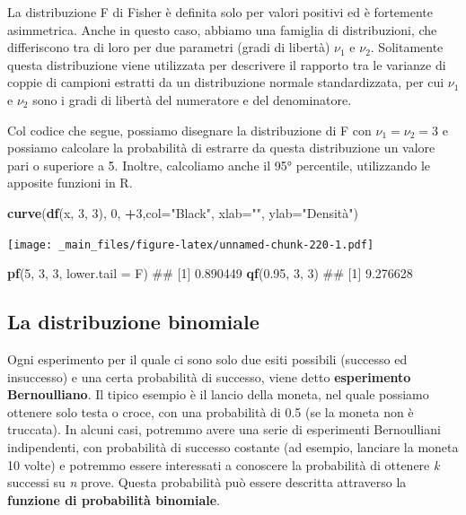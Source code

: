 \documentclass[a4paper,12pt,oneside]{book}
\newenvironment{Shaded}{\begin{snugshade}}{\end{snugshade}}
\newcommand{\KeywordTok}[1]{\textcolor[rgb]{0.13,0.29,0.53}{\textbf{#1}}}
\newcommand{\DataTypeTok}[1]{\textcolor[rgb]{0.13,0.29,0.53}{#1}}
\newcommand{\DecValTok}[1]{\textcolor[rgb]{0.00,0.00,0.81}{#1}}
\newcommand{\FloatTok}[1]{\textcolor[rgb]{0.00,0.00,0.81}{#1}}
\newcommand{\StringTok}[1]{\textcolor[rgb]{0.31,0.60,0.02}{#1}}
\newcommand{\OperatorTok}[1]{\textcolor[rgb]{0.81,0.36,0.00}{\textbf{#1}}}
\newcommand{\NormalTok}[1]{#1}
\theoremstyle{definition}
\theoremstyle{definition}
\theoremstyle{definition}
\theoremstyle{remark}
\begin{document}
La distribuzione F di Fisher è definita solo per valori positivi ed è
fortemente asimmetrica. Anche in questo caso, abbiamo una famiglia di
distribuzioni, che differiscono tra di loro per due parametri (gradi di
libertà) \(\nu_1\) e \(\nu_2\). Solitamente questa distribuzione viene
utilizzata per descrivere il rapporto tra le varianze di coppie di
campioni estratti da un distribuzione normale standardizzata, per cui
\(\nu_1\) e \(\nu_2\) sono i gradi di libertà del numeratore e del
denominatore.

Col codice che segue, possiamo disegnare la distribuzione di F con
\(\nu_1 = \nu_2 = 3\) e possiamo calcolare la probabilità di estrarre da
questa distribuzione un valore pari o superiore a 5. Inoltre, calcoliamo
anche il 95° percentile, utilizzando le apposite funzioni in R.

\begin{Shaded}
\begin{Highlighting}[]
\KeywordTok{curve}\NormalTok{(}\KeywordTok{df}\NormalTok{(x, }\DecValTok{3}\NormalTok{, }\DecValTok{3}\NormalTok{), }\DecValTok{0}\NormalTok{, }\OperatorTok{+}\DecValTok{3}\NormalTok{,}\DataTypeTok{col=}\StringTok{"Black"}\NormalTok{,}
     \DataTypeTok{xlab=}\StringTok{""}\NormalTok{, }\DataTypeTok{ylab=}\StringTok{"Densità"}\NormalTok{)}
\end{Highlighting}
\end{Shaded}

\texttt{[image: \_main\_files/figure-latex/unnamed-chunk-220-1.pdf]}

\begin{Shaded}
\begin{Highlighting}[]
\KeywordTok{pf}\NormalTok{(}\DecValTok{5}\NormalTok{, }\DecValTok{3}\NormalTok{, }\DecValTok{3}\NormalTok{, }\DataTypeTok{lower.tail =}\NormalTok{ F)}
\NormalTok{## [1] 0.890449}
\KeywordTok{qf}\NormalTok{(}\FloatTok{0.95}\NormalTok{, }\DecValTok{3}\NormalTok{, }\DecValTok{3}\NormalTok{)}
\NormalTok{## [1] 9.276628}
\end{Highlighting}
\end{Shaded}

\subsection{La distribuzione
binomiale}\label{la-distribuzione-binomiale}

Ogni esperimento per il quale ci sono solo due esiti possibili (successo
ed insuccesso) e una certa probabilità di successo, viene detto
\textbf{esperimento Bernoulliano}. Il tipico esempio è il lancio della
moneta, nel quale possiamo ottenere solo testa o croce, con una
probabilità di 0.5 (se la moneta non è truccata). In alcuni casi,
potremmo avere una serie di esperimenti Bernoulliani indipendenti, con
probabilità di successo costante (ad esempio, lanciare la moneta 10
volte) e potremmo essere interessati a conoscere la probabilità di
ottenere \emph{k} successi su \emph{n} prove. Questa probabilità può
essere descritta attraverso la \textbf{funzione di probabilità
binomiale}.
\end{document}
